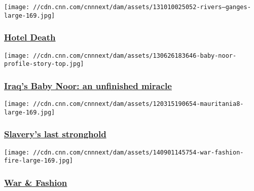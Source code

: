 \href{http://www.cnn.com/interactive/2014/04/world/india-hotel-death/index.html}{}

\texttt{[image: //cdn.cnn.com/cnnnext/dam/assets/131010025052-rivers---ganges-large-169.jpg]}

\hypertarget{hotel-death}{%
\subsubsection{\texorpdfstring{\href{http://www.cnn.com/interactive/2014/04/world/india-hotel-death/index.html}{Hotel
Death}}{Hotel Death}}\label{hotel-death}}

\href{http://www.cnn.com/interactive/2013/03/world/baby-noor/index.html}{}

\texttt{[image: //cdn.cnn.com/cnnnext/dam/assets/130626183646-baby-noor-profile-story-top.jpg]}

\hypertarget{iraqs-baby-noor-an-unfinished-miracle}{%
\subsubsection{\texorpdfstring{\href{http://www.cnn.com/interactive/2013/03/world/baby-noor/index.html}{Iraq's
Baby Noor: an unfinished
miracle}}{Iraq's Baby Noor: an unfinished miracle}}\label{iraqs-baby-noor-an-unfinished-miracle}}

\href{http://www.cnn.com/interactive/2012/03/world/mauritania.slaverys.last.stronghold/index.html}{}

\texttt{[image: //cdn.cnn.com/cnnnext/dam/assets/120315190654-mauritania8-large-169.jpg]}

\hypertarget{slaverys-last-stronghold}{%
\subsubsection{\texorpdfstring{\href{http://www.cnn.com/interactive/2012/03/world/mauritania.slaverys.last.stronghold/index.html}{Slavery's
last
stronghold}}{Slavery's last stronghold}}\label{slaverys-last-stronghold}}

\href{http://www.cnn.com/interactive/2013/02/world/war-and-fashion/}{}

\texttt{[image: //cdn.cnn.com/cnnnext/dam/assets/140901145754-war-fashion-fire-large-169.jpg]}

\hypertarget{war--fashion}{%
\subsubsection{\texorpdfstring{\href{http://www.cnn.com/interactive/2013/02/world/war-and-fashion/}{War
\& Fashion}}{War \& Fashion}}\label{war--fashion}}

